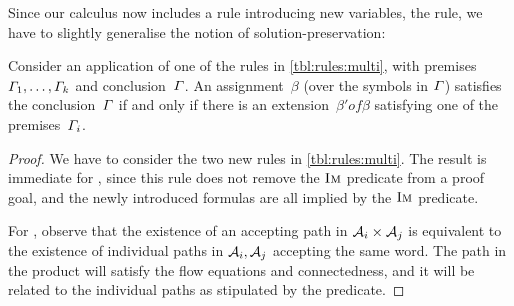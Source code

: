 
Since our calculus now includes a rule introducing new variables, the
\Materialise{} rule, we have to slightly generalise the notion of
solution-preservation:
%
\begin{lemma}\label{lma:multi-correct}
  Consider an application of one of the rules in
  \cref{tbl:rules:multi}, with
  premises~$\varGamma_1, \ldots, \varGamma_k$ and
  conclusion~$\varGamma$. An assignment~$\beta$ (over the symbols in
  $\varGamma$) satisfies the conclusion~$\varGamma$ if and only if
  there is an extension~$\beta' of \beta$ satisfying one of the
  premises~$\varGamma_i$.
\end{lemma}

\begin{proof}
  We have to consider the two new rules in \cref{tbl:rules:multi}. The
  result is immediate for \ExpandM{}, since this rule does not remove the
  $\operatorname{\textsc{Im}}$ predicate from a proof goal, and the newly introduced formulas
  are all implied by the $\operatorname{\textsc{Im}}$ predicate.

  For \Materialise{}, observe that the existence of an accepting path
  in $\mathcal{A}_i \times \mathcal{A}_j$ is equivalent to the existence
  of individual paths in $\mathcal{A}_i, \mathcal{A}_j$ accepting the
  same word. The path in the product will satisfy the flow equations
  and connectedness, and it will be related to the individual paths as
  stipulated by the \BindingSum{} predicate.
\end{proof}